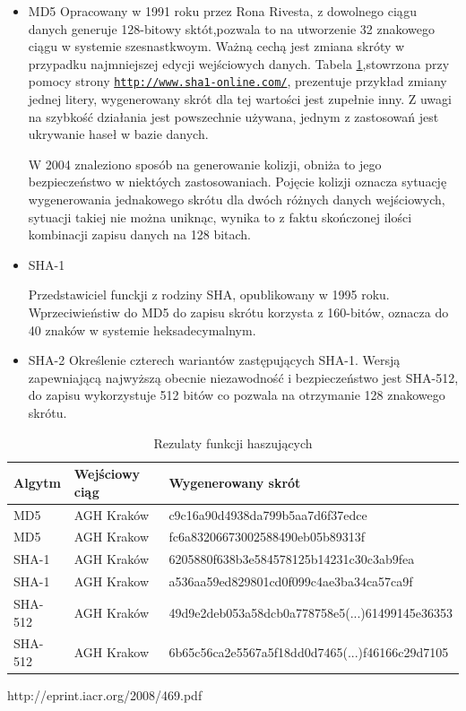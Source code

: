 \begin{itemize}
\item
MD5
Opracowany w 1991 roku przez Rona Rivesta, z dowolnego ciągu danych generuje 128-bitowy sktót,pozwala to na utworzenie 32 znakowego ciągu w systemie szesnastkwoym. Ważną cechą jest zmiana skróty w przypadku najmniejszej edycji wejściowych danych. Tabela \ref{tab:hashresult},stowrzona przy pomocy strony \underline{\texttt{http://www.sha1-online.com/}}, prezentuje przykład zmiany jednej litery, wygenerowany skrót dla tej wartości jest zupełnie inny.
Z uwagi na szybkość działania jest powszechnie używana, jednym z zastosowań jest ukrywanie haseł w bazie danych.


W 2004 znaleziono sposób na generowanie kolizji, obniża to jego bezpieczeństwo w niektóych zastosowaniach\cite{md5wiki}. Pojęcie kolizji oznacza sytuację wygenerowania jednakowego skrótu dla dwóch różnych danych wejściowych, sytuacji takiej nie można uniknąc, wynika to z faktu skończonej ilości kombinacji zapisu danych na 128 bitach.

\item
SHA-1

Przedstawiciel funckji z rodziny SHA, opublikowany w 1995 roku. Wprzeciwieństiw do MD5 do zapisu skrótu korzysta z 160-bitów, oznacza do 40 znaków w systemie heksadecymalnym.

\item
SHA-2
Określenie czterech wariantów zastępujących SHA-1. Wersją zapewniającą najwyższą obecnie niezawodność i bezpieczeństwo jest SHA-512, do zapisu wykorzystuje 512 bitów co pozwala na otrzymanie 128 znakowego skrótu.

\end{itemize}

\begin{table}[H]
    \centering
    \begin{tabular}{|l|l|l|}
    \hline
    Algytm & Wejściowy ciąg & Wygenerowany skrót  \\ \hline
    MD5 & AGH Kraków &    c9c16a90d4938da799b5aa7d6f37edce  \\ \hline
    MD5 & AGH Krakow &    fc6a83206673002588490eb05b89313f  \\ \hline
    SHA-1 & AGH Kraków &  6205880f638b3e584578125b14231c30c3ab9fea  \\ \hline
    SHA-1 & AGH Krakow  & a536aa59ed829801cd0f099c4ae3ba34ca57ca9f \\ \hline
    SHA-512 & AGH Kraków &  49d9e2deb053a58dcb0a778758e5(...)61499145e36353  \\ \hline
    SHA-512 & AGH Krakow  & 6b65c56ca2e5567a5f18dd0d7465(...)f46166c29d7105 \\ \hline
    \end{tabular}
    \caption{Rezulaty funkcji haszujących}
    \label{tab:hashresult}
\end{table}

http://eprint.iacr.org/2008/469.pdf
